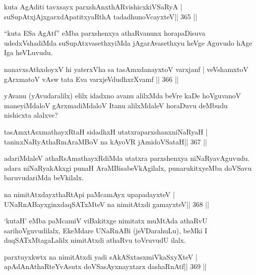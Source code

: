 
\begin{shl}
kuta AgAditi tavxsayx parxshAnxthARvishicxkiVSaRyA |
suSupAtxjAjxgarxdApatitxyaRthA tadadhunoVcayxteV\hfill || 365 ||
\end{shl}

\begin{artha}
``kuta ESa AgAtf'' eMba parxshenxya athaRvanunx horapaDisuva udedxVshadiMda suSupAtxvasethxyiMda jAgarAvasethxyu heVge Aguvudo hAge Iga heVLuvudu.
\end{artha}


\begin{shl}
nanavxsAthxdoyxV hi yaterxVha sa tasAmxdanayxtoV varxjanf |
veVshamxtoV gArxmatoV vA\s sw tata Eva varxjeVdudhxrXvamf \hfill || 366 ||
\end{shl}

\begin{artha}
yAvanu (yAvudaralilx) elilx idadxno avanu alilxMda beVre kaDe hoVguvanoV maneyiMdaloV gArxmadiMdaloV Itanu alilxMdaleV horaDuvu	deMbudu nishicxta alalxve?
\end{artha}

\begin{shl}
tasAmxtAsxmathayxRtaH sidadhxH utatxraparxshanxniNaRyaH |
taninxNaRyAthaRmAraMBoV na kAyoVR jAmidoVSataH\hfill || 367 ||
\end{shl}

\begin{artha}
adariMdaleV athaRsAmathayxRdiMda utatxra parxshenxya niNaRyavAguvudu. adara niNaRyakAkxgi punaH AraMBisabeVkAgilalx, punarukitxyeMba doVSavu baruvudariMda beVkilalx.
\end{artha}

\begin{shl}
na nimitAtxdayxthaRtA\s pi paMcamAyx upapadayxteV |
UNaRnABayxginxdaqSATxMteV na nimitAtxdi gamayxteV\hfill || 368 ||
\end{shl}

\begin{artha}
`kutaH' eMba paMcamiV viBakitxge nimitatx muMtAda athaRvU sarihoVguvudilalx, EkeMdare UNaRnABi (jeVDarahuLu), beMki I daqSATxMtagaLalilx nimitAtxdi athaRvu toVruvudU ilalx.
\end{artha}

\begin{shl}
parxtuyxkwtx na nimitAtxdi yadi sAkASxtasxmiVkaSxyXteV |
apAdAnAthaRteYvAsutx doVSasAyxnayxtarx dashaRnAtf\hfill || 369 ||
\end{shl}

